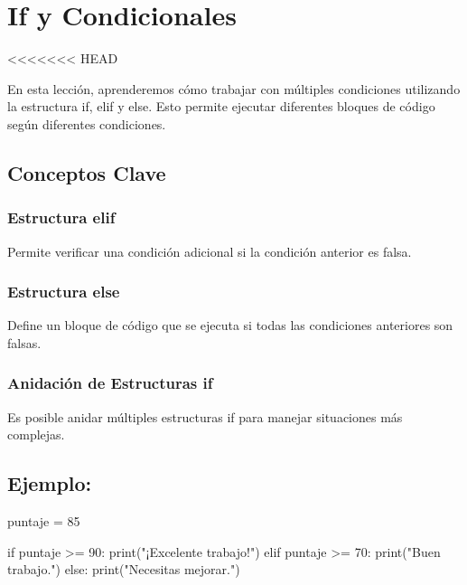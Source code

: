 \documentclass[
  a4paper,
  onepage,
  openany]{scrreprt}
\newenvironment{Shaded}{\begin{snugshade}}{\end{snugshade}}
\newcommand{\BuiltInTok}[1]{\textcolor[rgb]{0.00,0.23,0.31}{#1}}
\newcommand{\ControlFlowTok}[1]{\textcolor[rgb]{0.00,0.23,0.31}{#1}}
\newcommand{\DecValTok}[1]{\textcolor[rgb]{0.68,0.00,0.00}{#1}}
\newcommand{\NormalTok}[1]{\textcolor[rgb]{0.00,0.23,0.31}{#1}}
\newcommand{\OperatorTok}[1]{\textcolor[rgb]{0.37,0.37,0.37}{#1}}
\newcommand{\StringTok}[1]{\textcolor[rgb]{0.13,0.47,0.30}{#1}}
\begin{document}
\hypertarget{if-y-condicionales}{%
\chapter{If y Condicionales}\label{if-y-condicionales}}

\textless\textless\textless\textless\textless\textless\textless{} HEAD

En esta lección, aprenderemos cómo trabajar con múltiples condiciones
utilizando la estructura if, elif y else. Esto permite ejecutar
diferentes bloques de código según diferentes condiciones.

\hypertarget{conceptos-clave-30}{%
\section{Conceptos Clave}\label{conceptos-clave-30}}

\hypertarget{estructura-elif}{%
\subsection{Estructura elif}\label{estructura-elif}}

Permite verificar una condición adicional si la condición anterior es
falsa.

\hypertarget{estructura-else}{%
\subsection{Estructura else}\label{estructura-else}}

Define un bloque de código que se ejecuta si todas las condiciones
anteriores son falsas.

\hypertarget{anidaciuxf3n-de-estructuras-if}{%
\subsection{Anidación de Estructuras
if}\label{anidaciuxf3n-de-estructuras-if}}

Es posible anidar múltiples estructuras if para manejar situaciones más
complejas.

\hypertarget{ejemplo-30}{%
\section{Ejemplo:}\label{ejemplo-30}}

\begin{Shaded}
\begin{Highlighting}[]
\NormalTok{puntaje }\OperatorTok{=} \DecValTok{85}

\ControlFlowTok{if}\NormalTok{ puntaje }\OperatorTok{\textgreater{}=} \DecValTok{90}\NormalTok{:}
    \BuiltInTok{print}\NormalTok{(}\StringTok{"¡Excelente trabajo!"}\NormalTok{)}
\ControlFlowTok{elif}\NormalTok{ puntaje }\OperatorTok{\textgreater{}=} \DecValTok{70}\NormalTok{:}
    \BuiltInTok{print}\NormalTok{(}\StringTok{"Buen trabajo."}\NormalTok{)}
\ControlFlowTok{else}\NormalTok{:}
    \BuiltInTok{print}\NormalTok{(}\StringTok{"Necesitas mejorar."}\NormalTok{)}
\end{Highlighting}
\end{Shaded}
\end{document}
